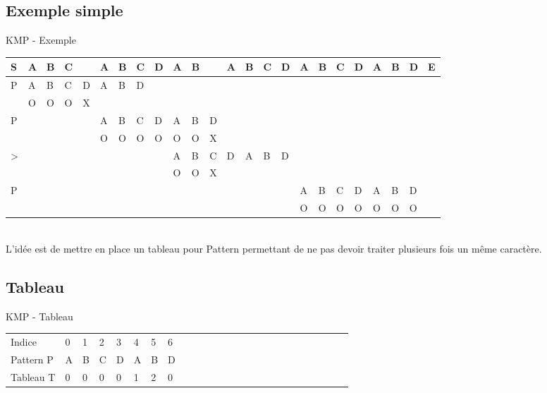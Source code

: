 \documentclass[12pt]{beamer}
\begin{document}
\subsection{Exemple simple}
\begin{frame}{KMP - Exemple}
\begin{tabular}{ l || p{0.01cm}p{0.01cm}p{0.01cm}p{0.01cm}p{0.01cm}p{0.01cm}p{0.01cm}p{0.01cm}p{0.01cm}p{0.01cm}p{0.01cm}p{0.01cm}p{0.01cm}p{0.01cm}p{0.01cm}p{0.01cm}p{0.01cm}p{0.01cm}p{0.01cm}p{0.01cm}p{0.01cm}p{0.01cm}p{0.01cm}} 
   S  &A&B&C& &A&B&C&D&A&B& &A&B&C&D&A&B&C&D&A&B&D&E \\ \hline
   P  &A&B&C&D&A&B&D  \\ 
      &O&O&O&X \\ \hline
   P  & & & & &A&B&C&D&A&B&D \\
   	  & & & & &O&O&O&O&O&O&X \\
   >  & & & & & & & & &A&B&C&D&A&B&D \\
   	  & & & & & & & & &O&O&X \\ \hline
   P  & & & & & & & & & & & & & & & &A&B&C&D&A&B&D \\
      & & & & & & & & & & & & & & & &O&O&O&O&O&O&O  
\end{tabular} \\
L'idée est de mettre en place un tableau pour Pattern permettant de ne pas devoir traiter plusieurs fois un même caractère.
\end{frame}


\subsection{Tableau}
\begin{frame}{KMP - Tableau}
\begin{center}
\begin{tabular}{ l || p{0.01cm}p{0.01cm}p{0.01cm}p{0.01cm}p{0.01cm}p{0.01cm}p{0.01cm}p{0.01cm}p{0.01cm}p{0.01cm}p{0.01cm}p{0.01cm}p{0.01cm}p{0.01cm}p{0.01cm}p{0.01cm}p{0.01cm}p{0.01cm}p{0.01cm}p{0.01cm}p{0.01cm}p{0.01cm}p{0.01cm}p{0.01cm}} 
   Indice  &0&1&2&3&4&5&6 \\
   Pattern P &A&B&C&D&A&B&D  \\ \hline
   Tableau T &0&0&0&0&1&2&0
\end{tabular}
\end{center}

\end{frame}
\end{document}
